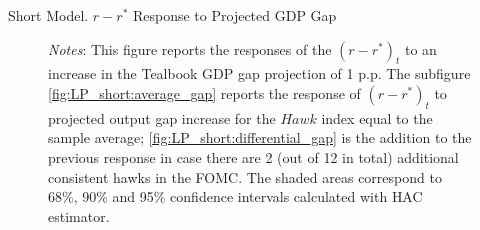 \documentclass[10pt,aspectratio=169]{beamer}
\begin{document}
\begin{frame}{Short Model. $r-r^*$ Response to Projected GDP Gap}
\begin{figure}[!htbp]
\begin{minipage}{1\textwidth}
\begin{subfigure}[b]{0.495\textwidth}
          \end{subfigure}\vspace{-2ex}
              {\begin{flushleft}\tiny\textit{Notes}: This figure reports the responses of the $(r-r^*)_t$ to an increase in the Tealbook GDP gap projection of 1 p.p. The subfigure \ref{fig:LP_short:average_gap} reports the response of $(r-r^*)_t$ to projected output gap increase for the $\mathit{Hawk}$ index equal to the sample average; \ref{fig:LP_short:differential_gap} is the addition to the previous response in case there are 2 (out of 12 in total) additional consistent hawks in the FOMC. The shaded areas correspond to 68\%, 90\% and 95\% confidence intervals calculated with \cite{Andrews1991} HAC estimator.\end{flushleft}}
        \end{minipage}
      \end{figure}
\end{frame}
\end{document}
